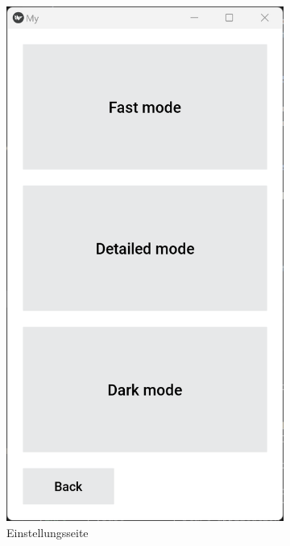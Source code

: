 \begin{figure}[h]
\begin{subfigure}[b]{0.22\textwidth}
		\includegraphics[width=\linewidth]{images/settingscreen.png}
		\caption{Einstellungsseite}
		\label{fig:settingscreen}
	\end{subfigure}
	\hfill
	\begin{subfigure}[b]{0.22\textwidth}

\end{subfigure}
\end{figure}
